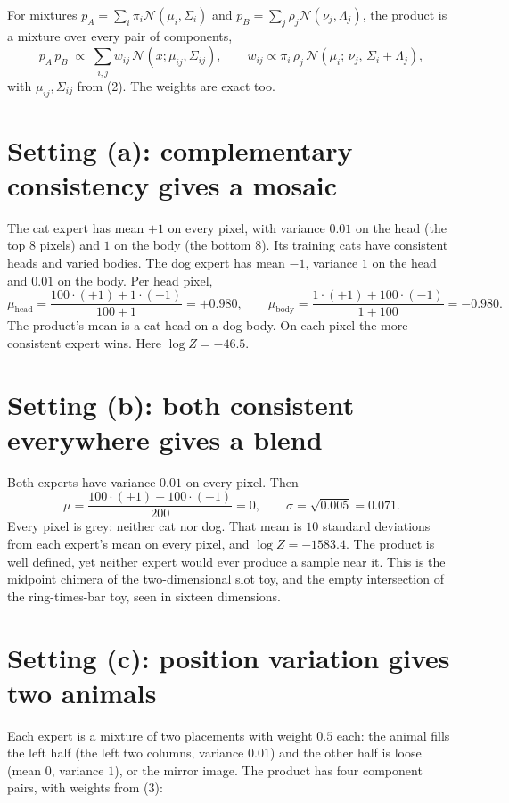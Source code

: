 \documentclass[11pt]{article}
\newcommand{\N}{\mathcal{N}}
\begin{document}
For mixtures $p_A = \sum_i \pi_i \N(\mu_i,\Sigma_i)$ and $p_B = \sum_j \rho_j \N(\nu_j,\Lambda_j)$,
the product is a mixture over every pair of components,
\begin{equation}
p_A\,p_B \;\propto\; \sum_{i,j} w_{ij}\,\N(x;\mu_{ij},\Sigma_{ij}), \qquad
w_{ij} \propto \pi_i\,\rho_j\,\N(\mu_i;\,\nu_j,\,\Sigma_i + \Lambda_j),
\end{equation}
with $\mu_{ij},\Sigma_{ij}$ from (2). The weights are exact too.

\section*{Setting (a): complementary consistency gives a mosaic}

The cat expert has mean $+1$ on every pixel, with variance $0.01$ on the head (the top 8 pixels) and $1$
on the body (the bottom 8). Its training cats have consistent heads and varied bodies. The dog expert has
mean $-1$, variance $1$ on the head and $0.01$ on the body. Per head pixel,
\[
\mu_{\text{head}} = \frac{100\cdot(+1) + 1\cdot(-1)}{100 + 1} = +0.980,
\qquad
\mu_{\text{body}} = \frac{1\cdot(+1) + 100\cdot(-1)}{1 + 100} = -0.980.
\]
The product's mean is a cat head on a dog body. On each pixel the more consistent expert wins.
Here $\log Z = -46.5$.

\section*{Setting (b): both consistent everywhere gives a blend}

Both experts have variance $0.01$ on every pixel. Then
\[
\mu = \frac{100\cdot(+1) + 100\cdot(-1)}{200} = 0, \qquad \sigma = \sqrt{0.005} = 0.071 .
\]
Every pixel is grey: neither cat nor dog. That mean is $10$ standard deviations from each expert's mean on
every pixel, and $\log Z = -1583.4$. The product is well defined, yet neither expert would ever produce a
sample near it. This is the midpoint chimera of the two-dimensional slot toy, and the empty intersection of
the ring-times-bar toy, seen in sixteen dimensions.

\section*{Setting (c): position variation gives two animals}

Each expert is a mixture of two placements with weight $0.5$ each: the animal fills the left half (the left
two columns, variance $0.01$) and the other half is loose (mean $0$, variance $1$), or the mirror image.
The product has four component pairs, with weights from (3):
\end{document}
